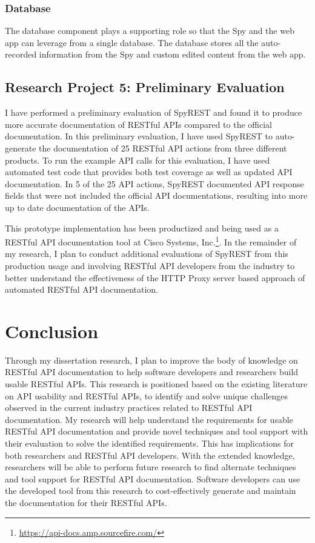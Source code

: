 \documentclass[11pt,oneside]{book}
\begin{document}
\subsection{Database}

The database component plays a supporting role so that the Spy and the web app can leverage from a single database. The database stores all the auto-recorded information from the Spy and custom edited content from the web app.

\section{Research Project 5: Preliminary Evaluation}

I have performed a preliminary evaluation of SpyREST and found it to produce more accurate documentation of RESTful APIs compared to the official documentation. In this preliminary evaluation, I have used SpyREST to auto-generate the documentation of 25 RESTful API actions from three different products. To run the example API calls for this evaluation, I have used automated test code that provides both test coverage as well as updated API documentation. In 5 of the 25 API actions, SpyREST documented API response fields that were not included the official API documentations, resulting into more up to date documentation of the APIs.

This prototype implementation has been productized and being used as a RESTful API documentation tool at Cisco Systems, Inc.\footnote{\url{https://api-docs.amp.sourcefire.com/}}. In the remainder of my research, I plan to conduct additional evaluations of SpyREST from this production usage and involving RESTful API developers from the industry to better understand the effectiveness of the HTTP Proxy server based approach of automated RESTful API documentation.

\chapter{Conclusion}

Through my dissertation research, I plan to improve the body of knowledge on RESTful API documentation to help software developers and researchers build usable RESTful APIs. This research is positioned based on the existing literature on API usability and RESTful APIs, to identify and solve unique challenges observed in the current industry practices related to RESTful API documentation. My research will help understand the requirements for usable RESTful API documentation and provide novel techniques and tool support with their evaluation to solve the identified requirements. This has implications for both researchers and RESTful API developers. With the extended knowledge, researchers will be able to perform future research to find alternate techniques and tool support for RESTful API documentation. Software developers can use the developed tool from this research to cost-effectively generate and maintain the documentation for their RESTful APIs.
\end{document}
